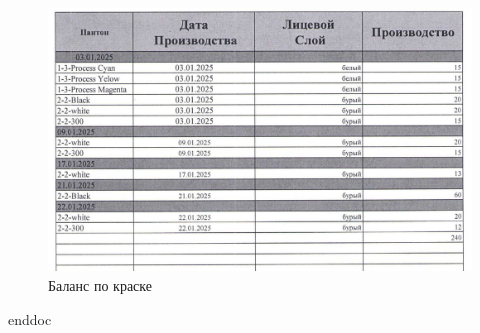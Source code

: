 \begin{figure}
\begin{center}
 \includegraphics[width=\linewidth, height=0.94\textheight, keepaspectratio]{Pics/f21.jpg}
\end{center}
\caption{Баланс по краске}
\label{pic:f21}
\end{figure}




\clearpage
 {enddoc}
